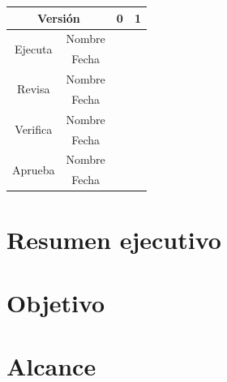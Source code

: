\documentclass[12pt]{article}
\begin{document}
\begin{table}[h]
\centering
\begin{tabular}{|cc|c|c|}
\hline
\multicolumn{2}{|c|}{Versión}                            & 0 & 1 \\ \hline
\multicolumn{1}{|c|}{\multirow{2}{*}{Ejecuta}}  & Nombre &   &   \\ \cline{2-4}
\multicolumn{1}{|c|}{}                          & Fecha  &   &   \\ \hline
\multicolumn{1}{|c|}{\multirow{2}{*}{Revisa}}   & Nombre &   &   \\ \cline{2-4}
\multicolumn{1}{|c|}{}                          & Fecha  &   &   \\ \hline
\multicolumn{1}{|c|}{\multirow{2}{*}{Verifica}} & Nombre &   &   \\ \cline{2-4}
\multicolumn{1}{|c|}{}                          & Fecha  &   &   \\ \hline
\multicolumn{1}{|c|}{\multirow{2}{*}{Aprueba}}  & Nombre &   &   \\ \cline{2-4}
\multicolumn{1}{|c|}{}                          & Fecha  &   &   \\ \hline
\end{tabular}
\end{table}

\newpage
\vspace*{0.1cm}

\renewcommand\contentsname{Tabla de contenido}
\tableofcontents


\newpage
\vspace*{0.1cm}

\renewcommand{\listfigurename}{Lista de figuras}
\listoffigures


\newpage
\vspace*{0.1cm}

\renewcommand{\listtablename}{Lista de tablas}
\listoftables


\newpage
\vspace*{0.1cm}

\section{Resumen ejecutivo}

\section{Objetivo}

\section{Alcance}
\end{document}
